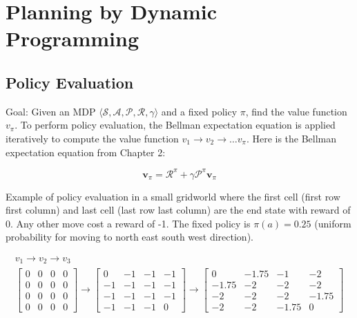 \section{Planning by Dynamic Programming}

\subsection{Policy Evaluation}

Goal: Given an MDP $\langle \mathcal{S}, \mathcal{A}, \mathcal{P}, \mathcal{R},
    \gamma \rangle$ and a fixed policy $\pi$, find the value function $v_\pi$. To
perform policy evaluation, the Bellman expectation equation is applied
iteratively to compute the value function $v_1 \to v_2 \to \ldots v_\pi$. Here
is the Bellman expectation equation from Chapter 2:

\[
    \mathbf{v}_{\pi} = \mathcal{R}^{\pi} + \gamma \mathcal{P}^{\pi} \mathbf{v}_{\pi}
\]

\noindent Example of policy evaluation in a small gridworld where the first cell (first
row first column) and last cell (last row last column) are the end state with
reward of 0. Any other move cost a reward of -1. The fixed policy is $\pi(a) =
    0.25$ (uniform probability for moving to north east south west direction).

\begin{gather*}
    v_1 \to v_2 \to v_3 \\
    \begin{bmatrix}
        0 & 0 & 0 & 0 \\
        0 & 0 & 0 & 0 \\
        0 & 0 & 0 & 0 \\
        0 & 0 & 0 & 0
    \end{bmatrix}         \to
    \begin{bmatrix}
        0  & -1 & -1 & -1 \\
        -1 & -1 & -1 & -1 \\
        -1 & -1 & -1 & -1 \\
        -1 & -1 & -1 & 0
    \end{bmatrix}     \to
    \begin{bmatrix}
        0     & -1.75 & -1    & -2    \\
        -1.75 & -2    & -2    & -2    \\
        -2    & -2    & -2    & -1.75 \\
        -2    & -2    & -1.75 & 0
    \end{bmatrix}
\end{gather*}


